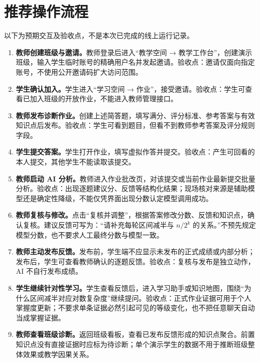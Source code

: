 \documentclass[UTF8,a4paper,zihao=-4,fontset=fandol]{ctexart}
\begin{document}
\section{推荐操作流程}
以下为预期交互及验收点，不是本次已完成的线上运行记录。
\begin{enumerate}
  \item \textbf{教师创建班级与邀请。}教师登录后进入“教学空间 → 教学工作台”，创建演示班级，输入学生临时账号的精确用户名并发起邀请。验收点：邀请仅面向指定账号，不使用公开邀请码扩大访问范围。
  \item \textbf{学生确认加入。}学生进入“学习空间 → 作业”，接受邀请。验收点：学生可查看已加入班级的开放作业，不能进入教师管理接口。
  \item \textbf{教师发布诊断作业。}创建上述简答题，填写满分、评分标准、参考答案与有效知识点后发布。验收点：学生可看到题目，但看不到教师参考答案及评分规则字段。
  \item \textbf{学生提交答案。}学生打开作业，填写虚拟作答并提交。验收点：产生可回看的本人提交，其他学生不能读取该提交。
  \item \textbf{教师启动 AI 分析。}教师进入作业批改页，对该提交或当前作业最新提交批量分析。验收点：出现逐题建议分、反馈等结构化结果；现场核对来源是辅助模型还是确定性降级，不能仅凭界面出现分数认定模型调用成功。
  \item \textbf{教师复核与修改。}点击“复核并调整”，根据答案修改分数、反馈和知识点，确认复核。建议反馈可写为：“请补充每轮区间减半与 $n/2^k$ 的关系。”不预先规定模型分数，也不要求人工最终分数与模型一致。
  \item \textbf{教师主动发布反馈。}发布前，学生端不应显示未发布的正式成绩或内部分析；发布后，学生可查看教师确认的逐题反馈。验收点：复核与发布是独立动作，AI 不自行发布成绩。
  \item \textbf{学生继续针对性学习。}学生查看反馈后，进入学习助手或知识地图，围绕“为什么区间减半对应对数复杂度”继续提问。验收点：正式作业证据可用于个人掌握度更新；不要求单条证据必然引起可见的等级变化，也不把任意聊天自动当成掌握证据。
  \item \textbf{教师查看班级诊断。}返回班级看板，查看已发布反馈形成的知识点聚合。前置知识点没有直接证据时应标为待诊断；单个演示学生的数据不用于推断班级整体效果或教学因果关系。
\end{enumerate}
\end{document}
